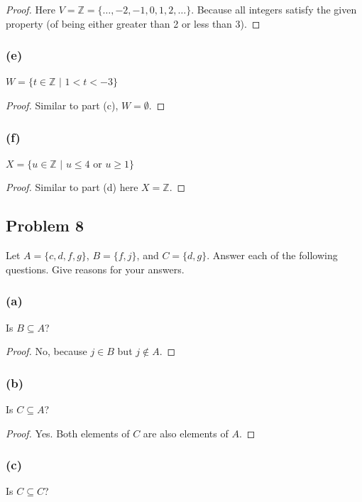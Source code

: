 \documentclass[14pt]{extarticle}
\newcommand{\Z}{\mathbb{Z}}
\begin{document}
\begin{proof}
    Here $V = \Z = \{\ldots, -2, -1, 0, 1, 2, \ldots\}$. Because all integers satisfy
    the given property (of being either greater than 2 or less than 3).
\end{proof}

\subsubsection{(e)}
$W = \{t \in \Z \,\, | \,\, 1 < t < -3\}$

\begin{proof}
    Similar to part (c), $W = \emptyset$.
\end{proof}

\subsubsection{(f)}
$X = \{u \in \Z \,\, | \,\, u \leq 4 \text{ or } u \geq 1\}$

\begin{proof}
    Similar to part (d) here $X = \Z$.
\end{proof}

\subsection{Problem 8}
Let $A = \{c, d, f, g\}$, $B = \{f, j\}$, and $C = \{d, g\}$. Answer each of the
following questions. Give reasons for your answers.

\subsubsection{(a)}
Is $B \subseteq A$?

\begin{proof}
    No, because $j \in B$ but $j \notin A$.
\end{proof}

\subsubsection{(b)}
Is $C \subseteq A$?

\begin{proof}
    Yes. Both elements of $C$ are also elements of $A$.
\end{proof}

\subsubsection{(c)}
Is $C \subseteq C$?
\end{document}
